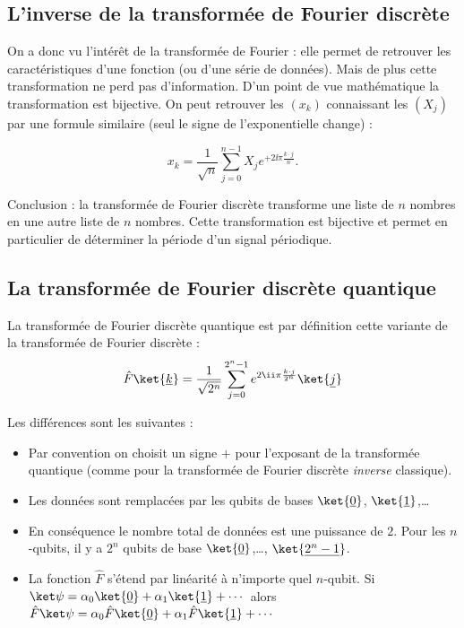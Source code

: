 \documentclass[11pt,class=report,crop=false]{standalone}
\begin{document}
\subsection{L'inverse de la transformée de Fourier discrète}

On a donc vu l'intérêt de la transformée de Fourier : elle permet de retrouver les caractéristiques d'une fonction (ou d'une série de données). Mais de plus cette transformation ne perd pas d'information. D'un point de vue mathématique la transformation est bijective. On peut retrouver les $(x_k)$ connaissant les $(X_j)$ par une formule similaire (seul le signe de l'exponentielle change) :

$$x_k = \frac{1}{\sqrt n}\sum_{j=0}^{n-1} X_j e^{+2\ii\pi \frac{k \cdot j}{n}}.$$


Conclusion : la transformée de Fourier discrète transforme une liste de $n$ nombres en  une autre liste de $n$ nombres. Cette transformation est bijective et permet en particulier de déterminer la période d'un signal périodique.

\subsection{La transformée de Fourier discrète quantique}

La transformée de Fourier discrète quantique est par définition cette variante de la transformée de Fourier discrète :
$$\hat F \ket{\underline k} = \frac{1}{\sqrt{2^n}} \sum_{j=0}^{2^n-1} e^{2\ii \pi \frac{k \cdot j}{2^n}} \ket{\underline j}$$

Les différences sont les suivantes :
\begin{itemize}
  \item Par convention on choisit un signe \og{}$+$\fg{} pour l'exposant de la transformée quantique (comme pour la transformée de Fourier discrète \emph{inverse} classique).

  \item Les données sont remplacées par les qubits de bases $\ket{\underline{0}}$, $\ket{\underline{1}}$,\ldots 

  \item En conséquence le nombre total de données est une puissance de $2$.
  Pour les $n$-qubits, il y a $2^n$ qubits de base $\ket{\underline{0}}$,\ldots, $\ket{\underline{2^{n}-1}}$.

  \item La fonction $\hat F$ s'étend par linéarité à n'importe quel $n$-qubit.
  Si $\ket\psi = \alpha_0\ket{\underline{0}}  + \alpha_1\ket{\underline{1}} + \cdots$ alors
  $\hat F \ket\psi = \alpha_0\hat F \ket{\underline 0} + \alpha_1\hat F\ket{\underline{1}} + \cdots $

\end{itemize}
\end{document}
